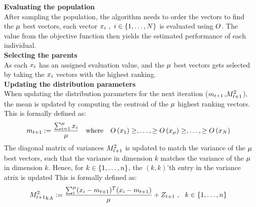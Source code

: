 \textbf{Evaluating the population}\\
After sampling the population, the algorithm needs to order the vectors to find the $\mu$ best vectors, each vector $x_{i}\ ,\ i \in \{1, \dots, N\}$ is evaluated using $O$. 
The value from the objective function then yields 
the estimated performance of each individual.
\\

\textbf{Selecting the parents}\\
As each $x_{i}$ has an assigned evaluation value, and the 
$\mu$ best vectors gets selected by 
taking the $x_{i}$ vectors with the highest ranking.
\\

\textbf{Updating the distribution parameters}\\
When updating the distribution parameters for the next iteration
($m_{t + 1}$,$M^2_{t + 1}$), 
the mean is updated by computing the centroid of the 
$\mu$ highest ranking vectors. This is formally defined as:
\begin{align*}
\mean_{\generation +1}:=\frac{\sum_{i=1}^{\offspringNumber} \individual_{i}}{\offspringNumber}
\ \ \ 
\text{where}
\ \ \ 
\fitnessFunction \left( \individual_{1} \right) \geq, \dots, 
\geq \fitnessFunction \left( \individual_{\offspringNumber} \right) \geq, 
\dots, \geq \fitnessFunction \left( \individual_{\populationSize} \right)
\end{align*}
The diagonal matrix of variances $M^2_{t + 1}$ is updated 
to match the variance of the $\mu$ best
vectors, such that the variance in dimension $k$ 
matches the variance of the $\mu$
in dimension $k$. Hence, for $k \in \{ 1,\dots,n \}$,
the $(k,k)$'th entry in the variance atrix is 
updated 
This is formally defined as:
\begin{align*}
{\varianceMatrix^2_{\generation +1}}_{k,k}:=\frac{\sum_{i}^{\offspringNumber}
(\individual_{i} - \mean_{\generation +1})^T(\individual_{i} - \mean_{\generation +1})}{\offspringNumber} + \noise_{\generation + 1}\ ,\ \ k \in \{ 1,\dots,\dimensions \}
\end{align*}
\\